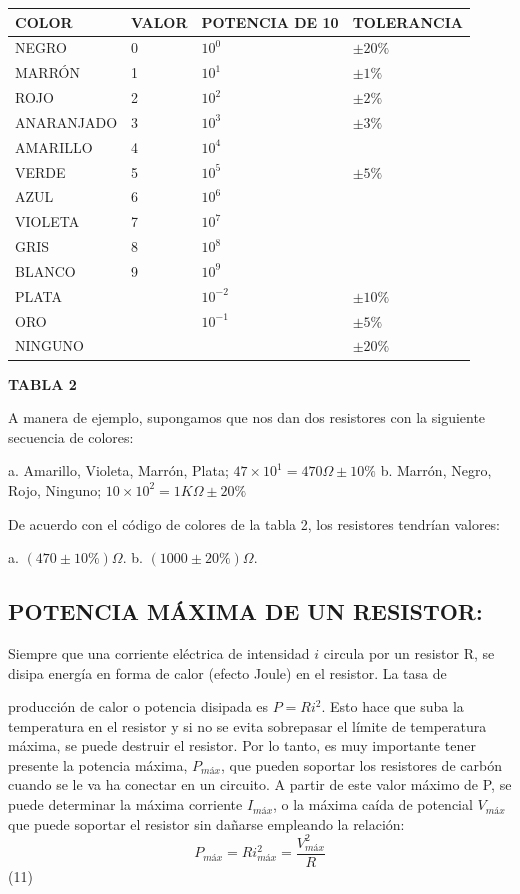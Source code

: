 \documentclass[11pt,a4paper]{article}
\begin{document}
\begin{center}\small
\begin{tabular}{llll}
\toprule
COLOR & VALOR & POTENCIA DE 10 & TOLERANCIA \\
\midrule
NEGRO & 0 & $10^0$ & $\pm 20 \%$ \\
MARRÓN & 1 & $10^1$ & $\pm 1 \%$ \\
ROJO & 2 & $10^2$ & $\pm 2 \%$ \\
ANARANJADO & 3 & $10^3$ & $\pm 3 \%$ \\
AMARILLO & 4 & $10^4$ &  \\
VERDE & 5 & $10^5$ & $\pm 5 \%$ \\
AZUL & 6 & $10^6$ &  \\
VIOLETA & 7 & $10^7$ &  \\
GRIS & 8 & $10^8$ &  \\
BLANCO & 9 & $10^9$ &  \\
PLATA &  & $10^{-2}$ & $\pm 10 \%$ \\
ORO &  & $10^{-1}$ & $\pm 5 \%$ \\
NINGUNO &  &  & $\pm 20 \%$ \\
\bottomrule
\end{tabular}
\end{center}

\begin{center}\small\textbf{TABLA 2}\end{center}

A manera de ejemplo, supongamos que nos dan dos resistores con la siguiente secuencia de colores:

a. Amarillo, Violeta, Marrón, Plata; $47 \times 10^1 = 470 \Omega \pm 10 \%$ b. Marrón, Negro, Rojo, Ninguno; $10 \times 10^2 = 1 K \Omega \pm 20 \%$

De acuerdo con el código de colores de la tabla 2, los resistores tendrían valores:

a. $(470 \pm 10 \%) \Omega$. b. $(1000 \pm 20 \%) \Omega$.

\subsection*{POTENCIA MÁXIMA DE UN RESISTOR:}

Siempre que una corriente eléctrica de intensidad $i$ circula por un resistor R, se disipa energía en forma de calor (efecto Joule) en el resistor. La tasa de

producción de calor o potencia disipada es $P=Ri^2$. Esto hace que suba la temperatura en el resistor y si no se evita sobrepasar el límite de temperatura máxima, se puede destruir el resistor. Por lo tanto, es muy importante tener presente la potencia máxima, $P_{máx}$, que pueden soportar los resistores de carbón cuando se le va ha conectar en un circuito. A partir de este valor máximo de P, se puede determinar la máxima corriente $I_{máx}$, o la máxima caída de potencial $V_{máx}$ que puede soportar el resistor sin dañarse empleando la relación: \[ P_{máx} = Ri_{máx}^2 = \frac{V_{máx}^2}{R} \] (11)
\end{document}
